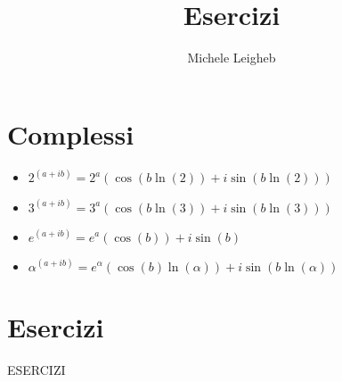 \documentclass{article}
\title{Esercizi}
\author{Michele Leigheb}
\date{}
\begin{document}
\maketitle
\tableofcontents{}
\section{Complessi}
\begin{itemize}
	\item \(\displaystyle 2^{(a+ib)} = 2^a (\cos(b \ln(2)) + i\sin(b \ln(2))) \)
	\item \(\displaystyle 3^{(a+ib)} = 3^a (\cos(b \ln(3)) + i\sin(b \ln(3))) \)
	\item \(\displaystyle e^{(a+ib)} = e^a (\cos(b)) + i\sin(b) \)
	\item \(\displaystyle \alpha^{(a+ib)} = e^{\alpha} (\cos(b)\ln(\alpha)) + i\sin(b\ln(\alpha)) \)
\end{itemize}



\section{Esercizi}

ESERCIZI
\end{document}
